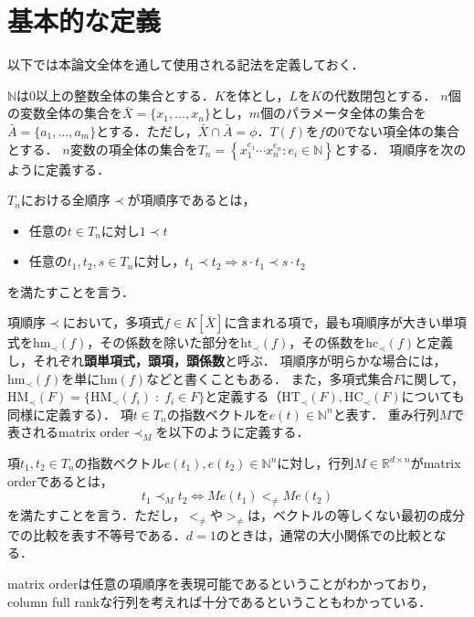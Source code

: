 \section{基本的な定義}
以下では本論文全体を通して使用される記法を定義しておく．
\par
$\mathbb{N}$は$0$以上の整数全体の集合とする．$K$を体とし，$L$を$K$の代数閉包とする．
$n$個の変数全体の集合を$\bar{X} = \{x_1, \dots, x_n\}$とし，$m$個のパラメータ全体の集合を$\bar{A} = \{a_1, \dots, a_m\}$とする．ただし，$\bar{X}\cap \bar{A} = \phi$．$T(f)$を$f$の$0$でない項全体の集合とする．
$n$変数の項全体の集合を$T_n = \left\{ x_1^{e_1} \cdots x_n^{e_n} : e_i \in \mathbb{N} \right\}$とする．
項順序を次のように定義する．
\begin{definition}[項順序]
	$T_n$における全順序$\prec$が項順序であるとは，
	\begin{itemize}
		\item 任意の$t \in T_n$に対し$1 \prec t$
		\item 任意の$t_1, t_2, s \in T_n$に対し，$t_1 \prec t_2 \Longrightarrow s\cdot t_1 \prec s\cdot t_2$
	\end{itemize}
	を満たすことを言う．
\end{definition}
項順序$\prec$において，多項式$f\in K[\bar{X}]$に含まれる項で，最も項順序が大きい単項式を$\mathrm{hm}_{\prec}(f)$，その係数を除いた部分を$\mathrm{ht}_{\prec}(f)$，その係数を$\mathrm{hc}_{\prec}(f)$と定義し，それぞれ\textbf{頭単項式，頭項，頭係数}と呼ぶ．
項順序が明らかな場合には，$\mathrm{hm}_{\prec}(f)$を単に$\mathrm{hm}(f)$などと書くこともある．
また，多項式集合$F$に関して，$\mathrm{HM}_{\prec}(F) = \{ \mathrm{HM}_{\prec}(f_i) \;:\; f_i \in F \}$と定義する（$\mathrm{HT}_{\prec}(F), \mathrm{HC}_{\prec}(F)$についても同様に定義する）．
項$t \in T_n$の指数ベクトルを$e(t) \in \mathbb{N}^{n}$と表す．
重み行列$M$で表されるmatrix order$\prec_M$を以下のように定義する．
\begin{definition}
	項$t_1, t_2 \in T_n$の指数ベクトル$e(t_1), e(t_2) \in \mathbb{N}^{n}$に対し，行列$M \in \mathbb{R}^{d\times n}$がmatrix orderであるとは，
	$$t_1 \prec_M t_2 \Longleftrightarrow Me(t_1) <_{\ne} Me(t_2)$$
	を満たすことを言う．ただし，$<_{\ne}$や$>_{\ne}$は，ベクトルの等しくない最初の成分での比較を表す不等号である．$d=1$のときは，通常の大小関係での比較となる．
\end{definition}
matrix orderは任意の項順序を表現可能である\cite{MR826583}ということがわかっており，column full rankな行列を考えれば十分であるということもわかっている．
\par
